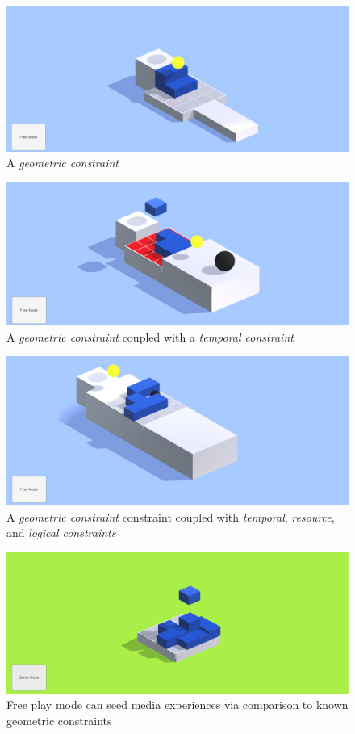 \documentclass[]{article}
\begin{document}
\begin{figure}
	\includegraphics[width=\textwidth]{figures/GameScrnsht1}
	\caption{A \emph{geometric constraint}}
	\label{fig:geom}
\end{figure}

\begin{figure}
	\includegraphics[width=\textwidth]{figures/GameScrnsht2}
	\caption{A \emph{geometric constraint} coupled with a \emph{temporal constraint}}
	\label{fig:temporal}
\end{figure}

\begin{figure}[t!]
	\includegraphics[width=\textwidth]{figures/GameScrnsht3}
	\caption{A \emph{geometric constraint} constraint coupled with \emph{temporal}, \emph{resource}, and \emph{logical constraints}}
	\label{fig:logical}
\end{figure}

\begin{figure}
	\includegraphics[width=\textwidth]{figures/GameScrnsht4}
	\caption{Free play mode can seed media experiences via comparison to known geometric constraints}
	\label{fig:free}
\end{figure}
\end{document}
